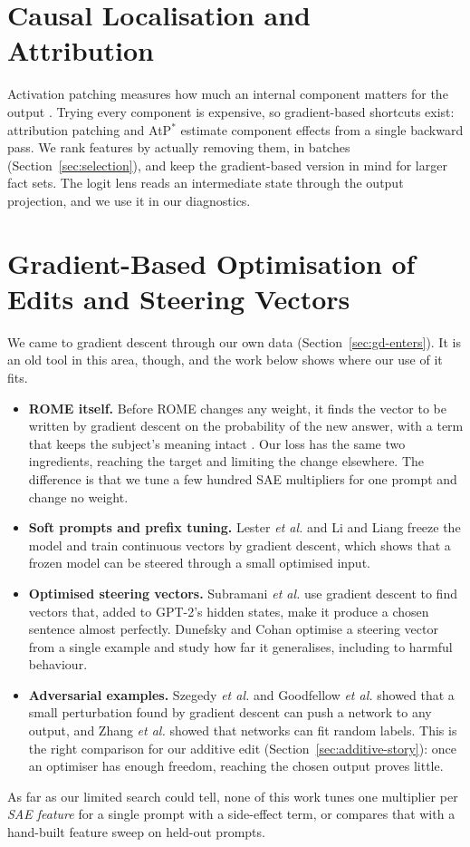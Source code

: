 \section{Causal Localisation and Attribution}

Activation patching measures how much an internal component matters for the output \cite{r21}. Trying every component is expensive, so gradient-based shortcuts exist: attribution patching and AtP$^*$ \cite{r16} estimate component effects from a single backward pass. We rank features by actually removing them, in batches (Section~\ref{sec:selection}), and keep the gradient-based version in mind for larger fact sets. The logit lens \cite{r37} reads an intermediate state through the output projection, and we use it in our diagnostics.

\section{Gradient-Based Optimisation of Edits and Steering Vectors}\label{sec:lit-gd}

We came to gradient descent through our own data (Section~\ref{sec:gd-enters}). It is an old tool in this area, though, and the work below shows where our use of it fits.
\begin{itemize}
  \item \textbf{ROME itself.} Before ROME changes any weight, it finds the vector to be written by gradient descent on the probability of the new answer, with a term that keeps the subject's meaning intact \cite{r2}. Our loss has the same two ingredients, reaching the target and limiting the change elsewhere. The difference is that we tune a few hundred SAE multipliers for one prompt and change no weight.
  \item \textbf{Soft prompts and prefix tuning.} Lester \textit{et al.} \cite{r46} and Li and Liang \cite{r47} freeze the model and train continuous vectors by gradient descent, which shows that a frozen model can be steered through a small optimised input.
  \item \textbf{Optimised steering vectors.} Subramani \textit{et al.} \cite{r48} use gradient descent to find vectors that, added to GPT-2's hidden states, make it produce a chosen sentence almost perfectly. Dunefsky and Cohan \cite{r49} optimise a steering vector from a single example and study how far it generalises, including to harmful behaviour.
  \item \textbf{Adversarial examples.} Szegedy \textit{et al.} \cite{r50} and Goodfellow \textit{et al.} \cite{r51} showed that a small perturbation found by gradient descent can push a network to any output, and Zhang \textit{et al.} \cite{r52} showed that networks can fit random labels. This is the right comparison for our additive edit (Section~\ref{sec:additive-story}): once an optimiser has enough freedom, reaching the chosen output proves little.
\end{itemize}
As far as our limited search could tell, none of this work tunes one multiplier per \emph{SAE feature} for a single prompt with a side-effect term, or compares that with a hand-built feature sweep on held-out prompts.

